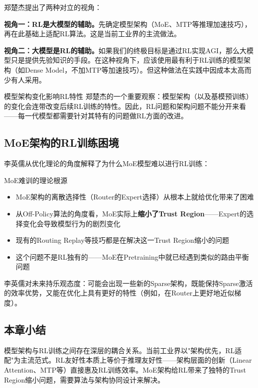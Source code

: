 郑楚杰提出了两种对立的视角：

\textbf{视角一：RL是大模型的辅助。}先确定模型架构（MoE、MTP等推理加速技巧），再在此基础上适配RL算法。这是当前工业界的主流做法。

\textbf{视角二：大模型是RL的辅助。}如果我们的终极目标是通过RL实现AGI，那么大模型只是提供先验知识的手段。在这种视角下，应该使用最有利于RL训练的模型架构（如Dense Model，不加MTP等加速技巧）。但这种做法在实践中因成本太高而少有人采用。

\begin{knowledgebox}{模型架构变化影响RL特性}
郑楚杰的一个重要观察：模型架构（以及基模预训练）的变化会连带改变后续RL训练的特性。因此，RL问题和架构问题不能分开来看——每一代模型都需要针对其特有的问题做RL方面的改进。
\end{knowledgebox}

\subsection{MoE架构的RL训练困境}

李英儒从优化理论的角度解释了为什么MoE模型难以进行RL训练：

\begin{warningbox}{MoE难训的理论根源}
\begin{itemize}
    \item MoE架构的离散选择性（Router的Expert选择）从根本上就给优化带来了困难
    \item 从Off-Policy算法的角度看，MoE实际上\textbf{缩小了Trust Region}——Expert的选择变化会导致模型行为的剧烈变化
    \item 现有的Routing Replay等技巧都是在解决这一Trust Region缩小的问题
    \item 这个问题不是RL独有的——MoE在Pretraining中就已经遇到类似的路由平衡问题
\end{itemize}
\end{warningbox}

李英儒对未来持乐观态度：可能会出现一些新的Sparse架构，既能保持Sparse激活的效率优势，又能在优化上具有更好的特性（例如，在Router上更好地近似梯度）。

\subsection{本章小结}

模型架构与RL训练之间存在深层的耦合关系。当前工业界以"架构优先，RL适配"为主流范式。RL友好性本质上等价于推理友好性——架构层面的创新（Linear Attention、MTP等）直接惠及RL训练效率。MoE架构给RL带来了独特的Trust Region缩小问题，需要算法与架构协同设计来解决。


